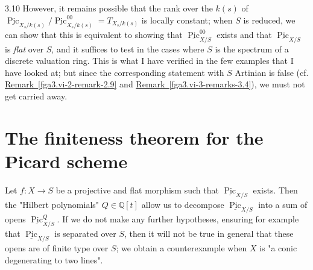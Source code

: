 \begin{remark}{3.10}
    However, it remains possible that the rank over the \(k(s)\) of \(\underline {\operatorname {Pic}}_{X_s/k(s)}/\underline {\operatorname {Pic}}_{X_s/k(s)}^{00}=T_{X_s/k(s)}\) is locally constant;
    when \(S\) is reduced, we  can show that this is equivalent to showing that \(\underline {\operatorname {Pic}}_{X/S}^{00}\) exists and that \(\underline {\operatorname {Pic}}_{X/S}\) is \emph{flat} over \(S\), and it suffices to test in the cases where \(S\) is the spectrum of a discrete valuation ring.
    This is what I have verified in the few examples that I have looked at;
    but since the corresponding statement with \(S\) Artinian is false (cf. \hyperref[fga3.vi-2-remark-2.9]{Remark~\ref*{fga3.vi-2-remark-2.9}} and \hyperref[fga3.vi-3-remarks-3.4]{Remark~\ref*{fga3.vi-3-remarks-3.4}}), we must not get carried away.\end{remark}\chapter{The finiteness theorem for the Picard scheme}\thispagestyle{fancy}\label{fga3.vi-4}\par{}Let \(f\colon  X\to  S\) be a projective and flat morphism such that \(\underline {\operatorname {Pic}}_{X/S}\) exists.
  Then the "Hilbert polynomials" \(Q\in \mathbb {Q}[t]\) allow us to decompose \(\underline {\operatorname {Pic}}_{X/S}\) into a sum of opens \(\underline {\operatorname {Pic}}_{X/S}^Q\).
  If we do not make any further hypotheses, ensuring for example that \(\underline {\operatorname {Pic}}_{X/S}\) is separated over \(S\), then it will not be true in general that these opens are of finite type over \(S\);
  we obtain a counterexample when \(X\) is "a conic degenerating to two lines".
  
